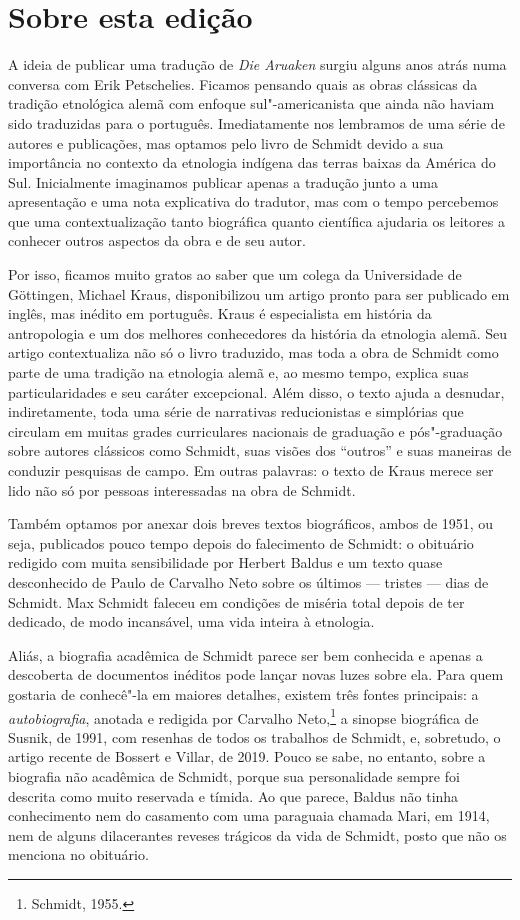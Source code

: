 \section{Sobre esta edição}

A ideia de publicar uma tradução de \textit{Die Aruaken} surgiu alguns
anos atrás numa conversa com Erik Petschelies. Ficamos pensando quais as
obras clássicas da tradição etnológica alemã com enfoque sul"-americanista
que ainda não haviam sido traduzidas para o português. Imediatamente nos
lembramos de uma série de autores e publicações, mas optamos pelo livro
de Schmidt devido a sua importância no contexto da etnologia
indígena das terras baixas da América do Sul. Inicialmente imaginamos
publicar apenas a tradução junto a uma apresentação e uma nota
explicativa do tradutor, mas com o tempo percebemos que uma
contextualização tanto biográfica quanto científica ajudaria os leitores
a conhecer outros aspectos da obra e de seu autor.

Por isso, ficamos muito gratos ao saber que um colega da Universidade de
Göttingen, Michael Kraus, disponibilizou um artigo pronto para ser
publicado em inglês, mas inédito em português. Kraus é
especialista em história da antropologia e um dos melhores conhecedores
da história da etnologia alemã. Seu artigo contextualiza não só o
livro traduzido, mas toda a obra de Schmidt como parte de uma tradição
na etnologia alemã e, ao mesmo tempo, explica suas particularidades e
seu caráter excepcional. Além disso, o texto ajuda a desnudar, indiretamente, 
toda uma série de narrativas reducionistas e
simplórias que circulam em muitas grades curriculares nacionais de
graduação e pós"-graduação sobre autores clássicos como Schmidt, suas
visões dos ``outros'' e suas maneiras de conduzir pesquisas de campo. Em
outras palavras: o texto de Kraus merece ser lido não só por pessoas
interessadas na obra de Schmidt.

Também optamos por anexar dois breves textos biográficos, ambos de
1951, ou seja, publicados pouco tempo depois do falecimento de Schmidt:
o obituário redigido com muita sensibilidade por Herbert Baldus e um
texto quase desconhecido de Paulo de Carvalho Neto sobre os últimos ---
tristes --- dias de Schmidt. Max Schmidt faleceu em condições de miséria
total depois de ter dedicado, de modo incansável, uma vida inteira à
etnologia.

Aliás, a biografia acadêmica de Schmidt parece ser bem %
conhecida e apenas a descoberta de documentos inéditos pode lançar novas luzes sobre
ela. Para quem gostaria de conhecê"-la em maiores detalhes, existem três
fontes principais: a \textit{autobiografia}, anotada e redigida por Carvalho
Neto,\footnote{Schmidt, 1955.} a sinopse biográfica de Susnik, de 1991, com
resenhas de todos os trabalhos de Schmidt, e, sobretudo, o artigo
recente de Bossert e Villar, de 2019. Pouco se sabe, no entanto, sobre a
biografia não acadêmica de Schmidt, porque sua personalidade sempre foi
descrita como muito reservada e tímida. Ao que parece, Baldus não tinha
conhecimento nem do casamento com uma paraguaia chamada Mari, em 1914,
nem de alguns dilacerantes reveses trágicos da vida de Schmidt, posto que
não os menciona no obituário.

